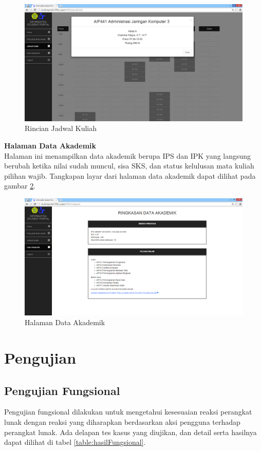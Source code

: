 					\begin{figure}[H]
						\centering
						\includegraphics[scale=0.5]{Gambar/hasil_jadwal_popup}
						\caption{Rincian Jadwal Kuliah} 
						\label{fig:5_hasil_jadwal_rinci}
					\end{figure}
					
				\textbf{Halaman Data Akademik}\\
				Halaman ini menampilkan data akademik berupa IPS dan IPK yang langsung berubah ketika nilai sudah muncul, sisa SKS, dan status kelulusan mata kuliah pilihan wajib. Tangkapan layar dari halaman data akademik dapat dilihat pada gambar \ref{fig:5_hasil_ringkasan}.
				\begin{figure}[H]
						\centering
						\includegraphics[scale=0.5]{Gambar/hasil_ringkasan}
						\caption{Halaman Data Akademik} 
						\label{fig:5_hasil_ringkasan}
					\end{figure}
				
\section{Pengujian}
			\subsection{Pengujian Fungsional} 
			Pengujian fungsional dilakukan untuk mengetahui kesesuaian reaksi perangkat lunak dengan reaksi yang diharapkan berdasarkan aksi pengguna terhadap perangkat lunak. Ada delapan tes kasus yang diujikan, dan detail serta hasilnya dapat dilihat di tabel \ref{table:hasilFungsional}.
			
